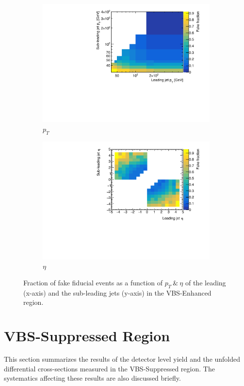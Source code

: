 \begin{figure}[htb]
    \centering
    \begin{subfigure}{.48\textwidth}
        \centering
        \includegraphics[width=.9\linewidth]{figures/Analysis/Unfolding/FakeFraction_pt_jets.pdf}
        \caption{ $p_{T}$ \label{fig:FidFakespT}}
    \end{subfigure}
    \begin{subfigure}{.48\textwidth}
        \centering
        \includegraphics[width=.9\linewidth]{figures/Analysis/Unfolding/FakeFraction_eta_jets.pdf}
        \caption{$\eta$\label{fig:FidFakeseta}}
    \end{subfigure}
    \caption{ Fraction of fake fiducial events as a function of $p_{T}~\&~\eta$ of the leading (x-axis) and the sub-leading jets (y-axis) in the VBS-Enhanced region.\label{fig:fake_fraction_jets}}
\end{figure}

\section{VBS-Suppressed Region}
\label{Appendix:VBSSupRegion}
This section summarizes the results of the detector level yield and the unfolded differential cross-sections measured in the VBS-Suppressed region. The systematics affecting these results are also discussed briefly.

